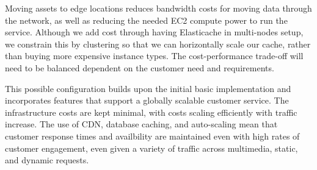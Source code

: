 
Moving assets to edge locations reduces bandwidth costs for moving data through the network, as well as reducing the needed EC2 compute power to run the service. Although we add cost through having Elasticache in multi-nodes setup, we constrain this by clustering so that we can horizontally scale our cache, rather than buying more expensive instance types. The cost-performance trade-off will need to be balanced dependent on the customer need and requirements.


This possible configuration builds upon the initial basic implementation and incorporates features that support a globally scalable customer service. The infrastructure costs are kept minimal, with costs scaling efficiently with traffic increase. The use of CDN, database caching, and auto-scaling mean that customer response times and availbility are maintained even with high rates of customer engagement, even given a variety of traffic across multimedia, static, and dynamic requests.
